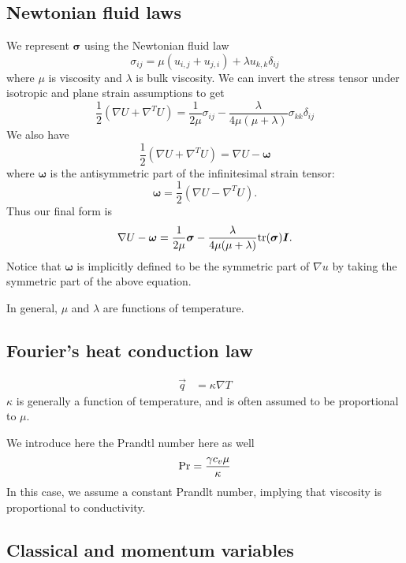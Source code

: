 \documentclass{article}
\newcommand{\grad}{\nabla}
\begin{document}
\subsection{Newtonian fluid laws}
We represent $\boldsymbol\sigma$ using the Newtonian fluid law
\[
\sigma_{ij} = \mu(u_{i,j} + u_{j,i}) + \lambda u_{k,k} \delta_{ij}
\]
where $\mu$ is viscosity and $\lambda$ is bulk viscosity. 
We can invert the stress tensor under isotropic and plane strain assumptions to get
\[
\frac{1}{2}\left(\grad  U + \grad ^T  U\right) = \frac{1}{2\mu} \sigma_{ij} - \frac{\lambda}{4\mu (\mu + \lambda)} \sigma_{kk}\delta_{ij}
\]
We also have
\[
\frac{1}{2}\left(\grad  U + \grad ^T  U\right) = \grad  U - \boldsymbol \omega
\]
where $\boldsymbol \omega$ is the antisymmetric part of the infinitesimal strain tensor:
\[
\boldsymbol \omega = \frac{1}{2}\left(\grad  U - \grad ^T  U\right).
\]
Thus our final form is
\begin{align*}
\grad  U - \boldsymbol \omega = \frac{1}{2\mu} \boldsymbol \sigma - \frac{\lambda}{4\mu (\mu + \lambda)} { \rm tr}(\boldsymbol \sigma) \boldsymbol I.
\end{align*}
Notice that $\boldsymbol \omega$ is implicitly defined to be the symmetric part of $\grad u$ by taking the symmetric part of the above equation.

In general, $\mu$ and $\lambda$ are functions of temperature.

\subsection{Fourier's heat conduction law}
\begin{align*}
\vec{q} &= \kappa \grad T
\end{align*}
$\kappa$ is generally a function of temperature, and is often assumed to be proportional to $\mu$. 

We introduce here the Prandtl number here as well
\[
{\rm Pr} = \frac{\gamma c_v \mu}{\kappa}
\]
In this case, we assume a constant Prandlt number, implying that viscosity is proportional to conductivity.

\subsection{Classical and momentum variables}
\end{document}
